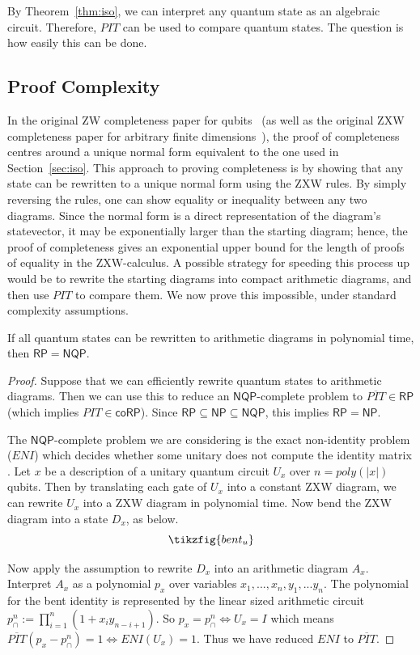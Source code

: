 By Theorem~\ref{thm:iso}, we can interpret any quantum state as an algebraic circuit. Therefore, $PIT$ can be used to compare quantum states. The question is how easily this can be done.

\subsection{Proof Complexity}

In the original ZW completeness paper for qubits~\cite{Hadzihasanovic2018zwzxcomplete} (as well as the original ZXW completeness paper for arbitrary finite dimensions~\cite{poor2023completeness}), the proof of completeness centres around a unique normal form equivalent to the one used in Section~\ref{sec:iso}. This approach to proving completeness is by showing that any state can be rewritten to a unique normal form using the ZXW rules. By simply reversing the rules, one can show equality or inequality between any two diagrams. Since the normal form is a direct representation of the diagram's statevector, it may be exponentially larger than the starting diagram; hence, the proof of completeness gives an exponential upper bound for the length of proofs of equality in the ZXW-calculus. A possible strategy for speeding this process up would be to rewrite the starting diagrams into compact arithmetic diagrams, and then use $PIT$ to compare them. We now prove this impossible, under standard complexity assumptions.

\begin{prop}
If all quantum states can be rewritten to arithmetic diagrams in polynomial time, then $\mathsf{RP} = \mathsf{NQP}$.
\end{prop}
\begin{proof}
Suppose that we can efficiently rewrite quantum states to arithmetic diagrams. Then we can use this to reduce an $\mathsf{NQP}$-complete problem to $\overline{PIT} \in \mathsf{RP}$ (which implies $PIT \in \mathsf{coRP}$). Since $\mathsf{RP} \subseteq \mathsf{NP} \subseteq \mathsf{NQP}$, this implies $\mathsf{RP} = \mathsf{NP}$.

The $\mathsf{NQP}$-complete problem we are considering is the exact non-identity problem ($ENI$) which decides whether some unitary does not compute the identity matrix \cite{tanaka2010exact}.  Let $x$ be a description of a unitary quantum circuit $U_x$ over $n = poly(|x|)$ qubits. Then by translating each gate of $U_x$ into a constant ZXW diagram, we can rewrite $U_x$ into a ZXW diagram in polynomial time. Now bend the ZXW diagram into a state $D_x$, as below.
\begin{equation}
	\tikzfig{bent_u}
\end{equation}

Now apply the assumption to rewrite $D_x$ into an arithmetic diagram $A_x$. Interpret $A_x$ as a polynomial $p_x$ over variables $x_1, ..., x_n, y_1, ... y_n$. The polynomial for the bent identity is represented by the linear sized arithmetic circuit $p^n_\cap := \prod_{i=1}^n (1 + x_iy_{n-i+1})$. So $p_x = p^n_\cap  \iff U_x = I$ which means $\overline{PIT}(p_x - p^n_\cap) = 1 \iff ENI(U_x) = 1$. Thus we have reduced $ENI$ to $\overline{PIT}$. 

\end{proof}


